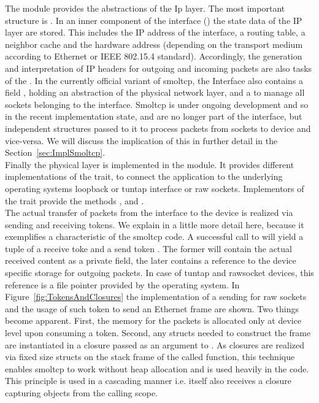 The  module provides the abstractions of the Ip layer. The most important structure is . In an inner component of the interface () the state data of the IP layer are stored. This includes the IP address of the interface, a routing table, a neighbor cache and the hardware address (depending on the transport medium according to Ethernet or IEEE 802.15.4 standard). Accordingly, the generation and interpretation of IP headers for outgoing and incoming packets are also tasks of the 
. In the currently official variant of smoltcp, the Interface also contains a field , holding an abstraction of the physical network layer, and a  to manage all sockets belonging to the interface. Smoltcp is under ongoing development and so in the recent implementation state,  and  are no longer part of the interface, but independent structures passed to it to process packets from sockets to device and vice-versa. We will discuss the implication of this in further detail in the Section~\ref{sec:ImplSmoltcp}. \\

Finally the physical layer is implemented in the  module. It provides different implementations of the  trait, to connect the application to the underlying operating systems loopback or tuntap interface or raw sockets. Implementors of the  trait provide the methods ,  and .\\

The actual transfer of packets from the interface to the device is realized via sending and receiving tokens. We explain in a little more detail here, because it exemplifies a characteristic of the smoltcp code. A successful call to  will yield a tuple of a receive toke  and a send token . The former will contain the actual received content as a private field, the later contains a reference to the device specific storage for outgoing packets. In case of tuntap and rawsocket devices, this reference is a file pointer provided by the operating system. In Figure~\ref{fig:TokensAndClosures} the implementation of a sending  for raw sockets and the usage of such token to send an Ethernet frame are shown. Two things become apparent. First, the memory for the packets is allocated only at device level upon consuming a token. Second, any structs needed to construct the frame are instantiated in a closure passed as an argument to . As closures are realized via fixed size structs on the stack frame of the called function, this technique enables smoltcp to work without heap allocation and is used heavily in the code. This principle is used in a cascading manner i.e.  itself also receives a closure capturing objects from the calling scope.\\

